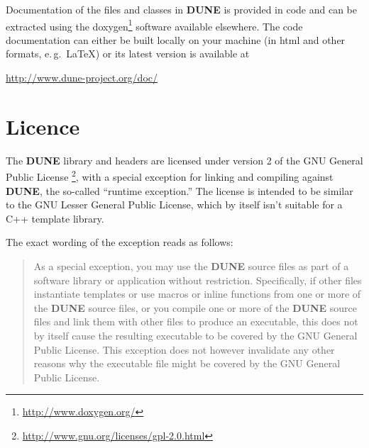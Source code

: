 \documentclass[11pt,a4paper,headinclude,footinclude,DIV16,normalheadings]{scrreprt}
\newcommand{\Dune}{{\sf\bfseries DUNE}\xspace}
\begin{document}
Documentation of the files and classes in \Dune{} is provided in code and
can be extracted using the
doxygen\footnote{\url{http://www.doxygen.org/}}
software available elsewhere. The code documentation can either be built
locally on your machine (in html and other formats, e.\,g.~\LaTeX) 
or its latest version is available at
\begin{center}
\url{http://www.dune-project.org/doc/}
\end{center}


\section{Licence}

The \Dune{} library and headers are licensed under version 2 of the
GNU General Public License%
\footnote{\url{http://www.gnu.org/licenses/gpl-2.0.html}}, with a special
exception for linking and compiling against \Dune{}, the so-called
``runtime exception.''  The license is intended to be similar to the
GNU Lesser General Public License, which by itself isn't suitable for
a C++ template library.

The exact wording of the exception reads as follows:

\begin{quote}  
   As a special exception, you may use the \Dune{} source files as part
   of a software library or application without restriction.
   Specifically, if other files instantiate templates or use macros or
   inline functions from one or more of the \Dune{} source files, or you
   compile one or more of the \Dune{} source files and link them with
   other files to produce an executable, this does not by itself cause
   the resulting executable to be covered by the GNU General Public
   License.  This exception does not however invalidate any other
   reasons why the executable file might be covered by the GNU General
   Public License.
\end{quote}





\end{document}
